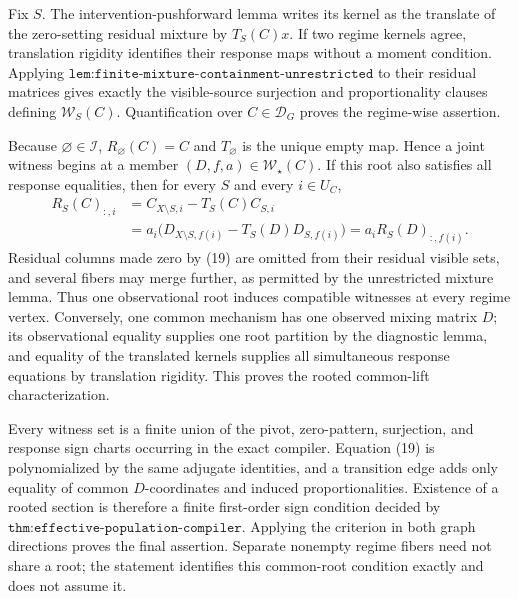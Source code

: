 Fix \(S\). The intervention-pushforward lemma writes its kernel as the translate of the zero-setting residual mixture by \(T_S(C)x\). If two regime kernels agree, translation rigidity identifies their response maps without a moment condition. Applying \(\texttt{lem:finite-mixture-containment-unrestricted}\) to their residual matrices gives exactly the visible-source surjection and proportionality clauses defining \(\mathcal W_S(C)\). Quantification over \(C\in\mathcal D_G\) proves the regime-wise assertion.

Because \(\varnothing\in\mathcal I\), \(R_\varnothing(C)=C\) and \(T_\varnothing\) is the unique empty map. Hence a joint witness begins at a member \((D,f,a)\in\mathcal W_\star(C)\). If this root also satisfies all response equalities, then for every \(S\) and every \(i\in U_C\),
\[
\begin{aligned}
R_S(C)_{:,i}
&=C_{X\setminus S,i}-T_S(C)C_{S,i}\\
&=a_i\bigl(D_{X\setminus S,f(i)}-T_S(D)D_{S,f(i)}\bigr)
=a_iR_S(D)_{:,f(i)}.
\end{aligned}\tag{19}
\]
Residual columns made zero by (19) are omitted from their residual visible sets, and several fibers may merge further, as permitted by the unrestricted mixture lemma. Thus one observational root induces compatible witnesses at every regime vertex. Conversely, one common mechanism has one observed mixing matrix \(D\); its observational equality supplies one root partition by the diagnostic lemma, and equality of the translated kernels supplies all simultaneous response equations by translation rigidity. This proves the rooted common-lift characterization.

Every witness set is a finite union of the pivot, zero-pattern, surjection, and response sign charts occurring in the exact compiler. Equation (19) is polynomialized by the same adjugate identities, and a transition edge adds only equality of common \(D\)-coordinates and induced proportionalities. Existence of a rooted section is therefore a finite first-order sign condition decided by \(\texttt{thm:effective-population-compiler}\). Applying the criterion in both graph directions proves the final assertion. Separate nonempty regime fibers need not share a root; the statement identifies this common-root condition exactly and does not assume it.
